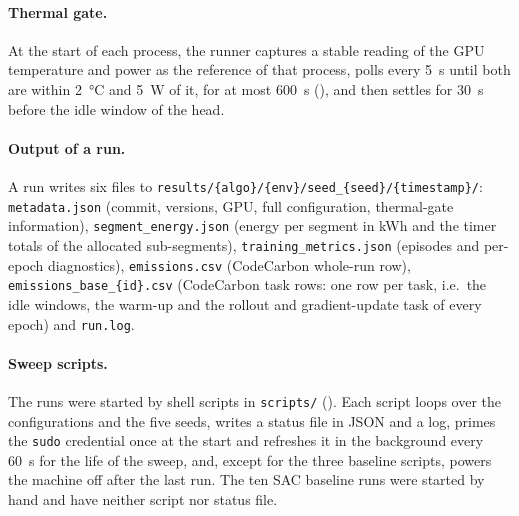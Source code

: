 \paragraph{Thermal gate.} At the start of each process, the runner captures a stable reading of the GPU temperature and power as the reference of that process, polls every \SI{5}{\second} until both are within \SI{2}{\celsius} and \SI{5}{\watt} of it, for at most \SI{600}{\second} (), and then settles for \SI{30}{\second} before the idle window of the head.

\paragraph{Output of a run.} A run writes six files to \texttt{results/\{algo\}/\{env\}/seed\_\{seed\}/\{timestamp\}/}: \texttt{metadata.json} (commit, versions, GPU, full configuration, thermal-gate information), \texttt{segment\_energy.json} (energy per segment in kWh and the timer totals of the allocated sub-segments), \texttt{training\_metrics.json} (episodes and per-epoch diagnostics), \texttt{emissions.csv} (CodeCarbon whole-run row), \texttt{emissions\_base\_\{id\}.csv} (CodeCarbon task rows: one row per task, i.e.\ the idle windows, the warm-up and the rollout and gradient-update task of every epoch) and \texttt{run.log}.

\paragraph{Sweep scripts.} The runs were started by shell scripts in \texttt{scripts/} ().
Each script loops over the configurations and the five seeds, writes a status file in JSON and a log, primes the \texttt{sudo} credential once at the start and refreshes it in the background every \SI{60}{\second} for the life of the sweep, and, except for the three baseline scripts, powers the machine off after the last run.
The ten SAC baseline runs were started by hand and have neither script nor status file.

\begin{table}[tbp]
  \centering
  \footnotesize
  \caption{Sweep scripts of the canonical runs and the files they left in \texttt{results/}.}
  \label{tab:app-repro-sweeps}
\end{table}

